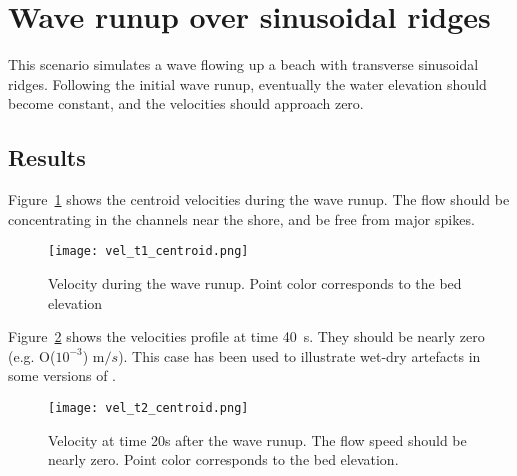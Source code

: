\section{Wave runup over sinusoidal ridges}
This scenario simulates a wave flowing up a beach with transverse sinusoidal ridges. Following the initial wave runup, eventually the water elevation should become constant, and the velocities should approach zero. 

\subsection{Results}
Figure~\ref{fig:vel_t1_centroid} shows the centroid velocities during the wave runup. The flow should be concentrating in the channels near the shore, and be free from major spikes.

\begin{figure}[h]
\begin{center}
\texttt{[image: vel\_t1\_centroid.png]}
\caption{Velocity during the wave runup. Point color corresponds to the bed elevation}
\label{fig:vel_t1_centroid}
\end{center}
\end{figure}

Figure~\ref{fig:vel_t2_centroid} shows the velocities profile at time 40~s. They should be nearly zero (e.g. O($10^{-3}$) m$/s$). This case has been used to illustrate wet-dry artefacts in some versions of \anuga.

\begin{figure}[h]
\begin{center}
\texttt{[image: vel\_t2\_centroid.png]}
\caption{Velocity at time 20s after the wave runup. The flow speed should be nearly zero. Point color corresponds to the bed elevation.}
\label{fig:vel_t2_centroid}
\end{center}
\end{figure}

\endinput
